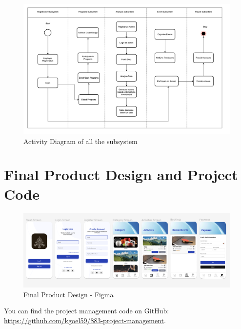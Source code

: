 \begin{figure}[h!t]
    \centering
    \includegraphics[width=\textwidth]{images/activityDiagram.png}
    \caption{Activity Diagram of all the subsystem}
    \label{fig:activityDiagram}
\end{figure}

\FloatBarrier

\section{Final Product Design and Project Code}

\begin{figure}[h!t]
    \centering
    \includegraphics[width=\textwidth]{images/Design.png}
    \caption{Final Product Design - Figma}
    \label{fig:finalproductdesign}
\end{figure}

You can find the project management code on GitHub: \url{https://github.com/kgoel59/883-project-management}.




\FloatBarrier
\newpage